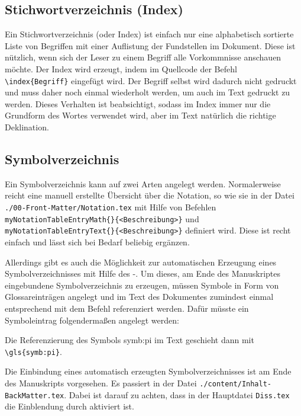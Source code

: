 \subsection{Stichwortverzeichnis (Index)}%
\label{sec:Index}
%
Ein Stichwortverzeichnis (oder
Index)
ist einfach nur eine alphabetisch sortierte Liste von Begriffen mit einer Auflistung der Fundstellen im Dokument.
Diese ist nützlich, wenn sich der Leser zu einem Begriff alle Vorkommnisse anschauen möchte.
Der Index wird erzeugt, indem im Quellcode der Befehl \verb+\index{Begriff}+
eingefügt wird. Der Begriff selbst wird dadurch nicht gedruckt und muss daher
noch einmal wiederholt werden, um auch im Text gedruckt zu werden. Dieses Verhalten
ist beabsichtigt, sodass im Index immer nur die Grundform des Wortes verwendet
wird, aber im Text natürlich die richtige Deklination.


\subsection{Symbolverzeichnis}%
\label{sec:Symbolverz}
%
Ein Symbolverzeichnis kann auf zwei Arten angelegt werden.
Normalerweise reicht eine manuell erstellte Übersicht über die Notation,
so wie sie in der Datei \texttt{./00-Front-Matter/Notation.tex}
mit Hilfe von Befehlen
\texttt{\bs myNotationTableEntryMath\{<Mathe-Ausdruck>\}\{<Beschreibung>\}}
und
\texttt{\bs myNotationTableEntryText\{<Text-Ausdruck>\}\{<Beschreibung>\}}
definiert wird.
Diese ist recht einfach und lässt sich bei Bedarf beliebig ergänzen.

Allerdings gibt es auch die Möglichkeit zur automatischen Erzeugung eines
Symbolverzeichnisses mit Hilfe des -.
Um dieses, am Ende des Manuskriptes eingebundene Symbolverzeichnis zu erzeugen,
müssen Symbole in Form von Glossareinträgen angelegt und im Text des Dokumentes
zumindest einmal entsprechend mit dem Befehl  referenziert werden.
Dafür müsste ein Symboleintrag folgendermaßen angelegt werden:
\begin{latex}[caption={Definition eines Symboleintrages},label={lst:SymbEntry}]
\end{latex}
Die Referenzierung des Symbols \gls{symb:pi} im Text geschieht dann mit \verb+\gls{symb:pi}+.

Die Einbindung eines automatisch erzeugten Symbolverzeichnisses ist am Ende des Manuskripts vorgesehen.
Es passiert in der Datei
\texttt{./content/Inhalt-BackMatter.tex}.
Dabei ist darauf zu achten, dass in der Hauptdatei \texttt{Diss.tex}
die Einblendung durch  aktiviert ist.
